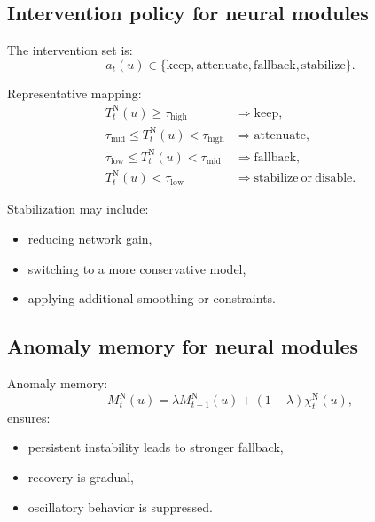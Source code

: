 \documentclass[11pt,letterpaper]{article}
\theoremstyle{gcresult}
\theoremstyle{definition}
\begin{document}
\subsection{Intervention policy for neural modules}

The intervention set is:
\begin{equation}
a_t(u)\in\{\mathrm{keep},\mathrm{attenuate},\mathrm{fallback},\mathrm{stabilize}\}.
\end{equation}

Representative mapping:
\begin{align}
T^{\mathrm{N}}_t(u)\ge \tau_{\mathrm{high}} &\Rightarrow \mathrm{keep},\\
\tau_{\mathrm{mid}}\le T^{\mathrm{N}}_t(u)<\tau_{\mathrm{high}} &\Rightarrow \mathrm{attenuate},\\
\tau_{\mathrm{low}}\le T^{\mathrm{N}}_t(u)<\tau_{\mathrm{mid}} &\Rightarrow \mathrm{fallback},\\
T^{\mathrm{N}}_t(u)<\tau_{\mathrm{low}} &\Rightarrow \mathrm{stabilize\ or\ disable}.
\end{align}

Stabilization may include:
\begin{itemize}[leftmargin=1.5em]
    \item reducing network gain,
    \item switching to a more conservative model,
    \item applying additional smoothing or constraints.
\end{itemize}


\subsection{Anomaly memory for neural modules}

Anomaly memory:
\begin{equation}
M^{\mathrm{N}}_t(u)=\lambda M^{\mathrm{N}}_{t-1}(u)+(1-\lambda)\chi^{\mathrm{N}}_t(u),
\end{equation}
ensures:
\begin{itemize}[leftmargin=1.5em]
    \item persistent instability leads to stronger fallback,
    \item recovery is gradual,
    \item oscillatory behavior is suppressed.
\end{itemize}
\end{document}
